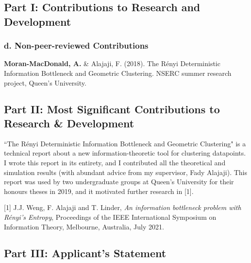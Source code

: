 \documentclass[letterpaper,12pt]{article}
\begin{document}
\subsection*{Part I: Contributions to Research and Development}
\subsubsection*{d. Non-peer-reviewed Contributions}
\textbf{Moran-MacDonald, A.} \& Alajaji, F. (2018). The R\'{e}nyi Deterministic
Information Bottleneck and Geometric Clustering. NSERC summer research project,
Queen's University.

\subsection*{Part II: Most Significant Contributions to Research \& Development}
``The R\'{e}nyi Deterministic Information Bottleneck and Geometric
Clustering" is a technical report about a new information-theoretic tool for
clustering datapoints.
I wrote this report in its entirety, and I contributed all the theoretical and
simulation results (with abundant advice from my supervisor, Fady Alajaji).
This report was used by two undergraduate groups at Queen's University for their
honours theses in 2019, and it motivated further research in [1].

[1] J.J. Weng, F. Alajaji and T. Linder, \textit{An information bottleneck
problem with R\'{e}nyi's Entropy}, Proceedings of the IEEE International
Symposium on Information Theory, Melbourne, Australia, July 2021.

\subsection*{Part III: Applicant's Statement}
\end{document}
